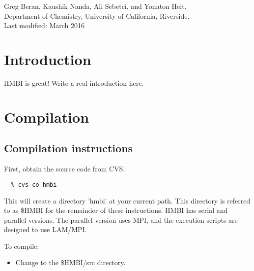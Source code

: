 \documentclass[11pt,letterpaper]{article}
\begin{document}
\begin{spacing}{1.0}

\thispagestyle{empty}


\section*{}

\thispagestyle{empty}

\noindent
\begin{center}
Greg Beran, Kaushik Nanda, Ali Sebetci, and Yonaton Heit.  \\
Department of Chemistry, University of California, Riverside.\\
Last modified: March 2016
\end{center}

\tableofcontents
\vspace{5mm}

\section{Introduction}

HMBI is great!  Write a real introduction here.




\section{Compilation}

\subsection{Compilation instructions}

First, obtain the source code from CVS.  
\begin{verbatim}
  % cvs co hmbi
\end{verbatim}

This will create a directory 'hmbi' at your current path.  This directory
is referred to as \$HMBI for the remainder of these instructions.
HMBI has serial and parallel versions.  The parallel version uses
MPI, and the execution scripts are designed to use LAM/MPI.  

To compile:
\begin{itemize}
\item Change to the \$HMBI/src directory.


\end{itemize}
\end{spacing}
\end{document}
